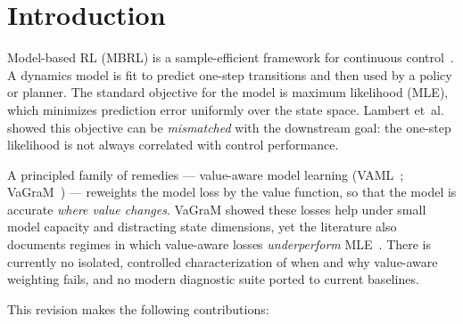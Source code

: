 \documentclass[11pt]{article}
\begin{document}
\section{Introduction}

Model-based RL (MBRL) is a sample-efficient framework for continuous
control~\cite{deisenroth2011pilco,janner2019mbpo,hafner2023dreamerv3,hansen2024tdmpc2}.
A dynamics model is fit to predict one-step transitions and then used by a policy or
planner. The standard objective for the model is maximum likelihood (MLE), which
minimizes prediction error uniformly over the state space. Lambert
et~al.~\cite{lambert2020objective} showed this objective can be \emph{mismatched} with
the downstream goal: the one-step likelihood is not always correlated with control
performance.

A principled family of remedies --- value-aware model learning
(VAML~\cite{farahmand2017vaml,farahmand2018itervaml}; VaGraM~\cite{voelcker2022vagram})
--- reweights the model loss by the value function, so that the model is accurate
\emph{where value changes}. VaGraM showed these losses help under small model capacity
and distracting state dimensions, yet the literature also documents regimes in which
value-aware losses \emph{underperform} MLE~\cite{voelcker2022vagram,cvaml2025,romi2026}.
There is currently no isolated, controlled characterization of when and why value-aware
weighting fails, and no modern diagnostic suite ported to current baselines.

This revision makes the following contributions:
\end{document}
